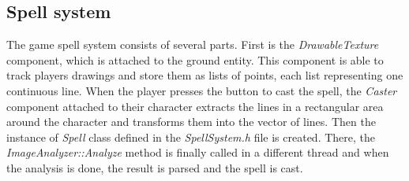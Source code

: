 \subsection{Spell system}
The game spell system consists of several parts. First is the \emph{DrawableTexture} component, which is attached to the ground entity. This component is able to track players drawings and store them as lists of points, each list representing one continuous line. When the player presses the button to cast the spell, the \emph{Caster} component attached to their character extracts the lines in a rectangular area around the character and transforms them into the vector of lines. Then the instance of \emph{Spell} class defined in the \emph{SpellSystem.h} file is created. There, the \emph{ImageAnalyzer::Analyze} method is finally called in a different thread and when the analysis is done, the result is parsed and the spell is cast.